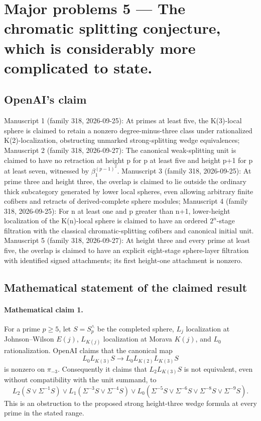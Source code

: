 \documentclass[11pt]{article}
\begin{document}
\section*{Major problems 5 — The chromatic splitting conjecture, which is considerably more complicated to state.}

\subsection{OpenAI's claim}
Manuscript 1 (family 318, 2026-09-25): At primes at least five, the K(3)-local sphere is claimed to retain a nonzero degree-minus-three class under rationalized K(2)-localization, obstructing unmarked strong-splitting wedge equivalences; Manuscript 2 (family 318, 2026-09-27): The canonical weak-splitting unit is claimed to have no retraction at height p for p at least five and height p+1 for p at least seven, witnessed by \(\beta_1^{(p-1)^2}\). Manuscript 3 (family 318, 2026-09-25): At prime three and height three, the overlap is claimed to lie outside the ordinary thick subcategory generated by lower local spheres, even allowing arbitrary finite cofibers and retracts of derived-complete sphere modules; Manuscript 4 (family 318, 2026-09-25): For n at least one and p greater than n+1, lower-height localization of the K(n)-local sphere is claimed to have an ordered \(2^n\)-stage filtration with the classical chromatic-splitting cofibers and canonical initial unit. Manuscript 5 (family 318, 2026-09-27): At height three and every prime at least five, the overlap is claimed to have an explicit eight-stage sphere-layer filtration with identified signed attachments; its first height-one attachment is nonzero.

\subsection{Mathematical statement of the claimed result}
\paragraph{Mathematical claim 1.} For a prime $p\ge5$, let $S=S_p^\wedge$ be the completed sphere, $L_j$ localization at Johnson--Wilson $E(j)$, $L_{K(j)}$ localization at Morava $K(j)$, and $L_0$ rationalization. OpenAI claims that the canonical map
\[
L_0L_{K(3)}S\longrightarrow L_0L_{K(2)}L_{K(3)}S
\]
is nonzero on $\pi_{-3}$. Consequently it claims that $L_2L_{K(3)}S$ is not equivalent, even without compatibility with the unit summand, to
\[
L_2(S\vee\Sigma^{-1}S)\vee L_1(\Sigma^{-3}S\vee\Sigma^{-4}S)
\vee L_0(\Sigma^{-5}S\vee\Sigma^{-6}S\vee\Sigma^{-8}S\vee\Sigma^{-9}S).
\]
This is an obstruction to the proposed strong height-three wedge formula at every prime in the stated range.
\end{document}
